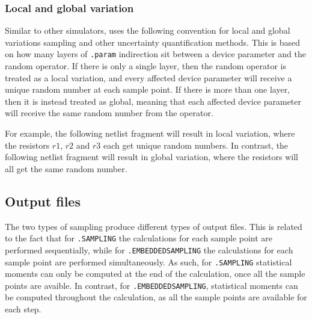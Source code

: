 \subsubsection{Local and global variation}

Similar to other simulators, \Xyce{} uses the following convention for 
local and global variations sampling and other uncertainty quantification 
methods.  This is based on how many layers of \texttt{.param} indirection 
sit between a device parameter and the random operator.  If there is only a single 
layer, then the random operator is treated as a local variation, and every
affected device parameter will receive a unique random number at each sample point.
If there is more than one layer, then it is instead treated as global, meaning 
that each affected device parameter will receive the same random number from the operator.

For example, the following netlist fragment will result in local variation, 
where the resistors $r1$, $r2$ and $r3$ each get unique random numbers.
In contrast, the following netlist fragment will result in global variation, 
where the resistors will all get the same random number.

\subsection{Output files}
\label{sampling_output_files}

The two types of sampling produce different types of output files.  This is 
related to the fact that for \texttt{.SAMPLING} the calculations for each sample 
point are performed sequentially, while for \texttt{.EMBEDDEDSAMPLING} the 
calculations for each sample point are performed simultaneously.  As such, 
for \texttt{.SAMPLING} statistical moments can only be computed at the end 
of the calculation, once all the sample points are avaible.  In contrast, 
for \texttt{.EMBEDDEDSAMPLING}, statistical moments can be computed throughout 
the calculation, as all the sample points are available for each step.

